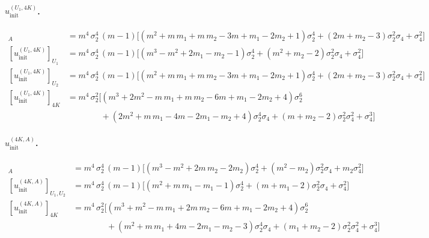 \documentclass[12pt,a4paper]{article}
\begin{document}
\paragraph{$u^{(U_{1}, 4K)}_{\mathrm{init}}$.}
\begin{align*}
[u^{(U_{1}, 4K)}_{\mathrm{init}}]_{A}
  &= m^{4}\,\sigma_{2}^{4}\,(m-1)\bigl[
       (m^{2} + m\,m_{1} + m\,m_{2} - 3m + m_{1} - 2m_{2} + 1)\sigma_{2}^{4}
       + (2m + m_{2} - 3)\sigma_{2}^{2}\sigma_{4} + \sigma_{4}^{2}\bigr]\\
[u^{(U_{1}, 4K)}_{\mathrm{init}}]_{U_{1}}
  &= m^{4}\,\sigma_{2}^{4}\,(m-1)\bigl[
       (m^{3} - m^{2} + 2m_{1} - m_{2} - 1)\sigma_{2}^{4}
       + (m^{2} + m_{2} - 2)\sigma_{2}^{2}\sigma_{4} + \sigma_{4}^{2}\bigr]\\
[u^{(U_{1}, 4K)}_{\mathrm{init}}]_{U_{2}}
  &= m^{4}\,\sigma_{2}^{4}\,(m-1)\bigl[
       (m^{2} + m\,m_{1} + m\,m_{2} - 3m + m_{1} - 2m_{2} + 1)\sigma_{2}^{4}
       + (2m + m_{2} - 3)\sigma_{2}^{2}\sigma_{4} + \sigma_{4}^{2}\bigr]\\
[u^{(U_{1}, 4K)}_{\mathrm{init}}]_{4K}
  &= m^{4}\,\sigma_{2}^{2}\bigl[
       (m^{3} + 2m^{2} - m\,m_{1} + m\,m_{2} - 6m + m_{1} - 2m_{2} + 4)\sigma_{2}^{6}\\
  &\hspace{4em}
       + (2m^{2} + m\,m_{1} - 4m - 2m_{1} - m_{2} + 4)\sigma_{2}^{4}\sigma_{4}
       + (m + m_{2} - 2)\sigma_{2}^{2}\sigma_{4}^{2} + \sigma_{4}^{3}\bigr]
\end{align*}

\paragraph{$u^{(4K, A)}_{\mathrm{init}}$.}
\begin{align*}
[u^{(4K, A)}_{\mathrm{init}}]_{A}
  &= m^{4}\,\sigma_{2}^{4}\,(m-1)\bigl[
       (m^{3} - m^{2} + 2m\,m_{2} - 2m_{2})\sigma_{2}^{4}
       + (m^{2} - m_{2})\sigma_{2}^{2}\sigma_{4} + m_{2}\sigma_{4}^{2}\bigr]\\
[u^{(4K, A)}_{\mathrm{init}}]_{U_{1}, U_{2}}
  &= m^{4}\,\sigma_{2}^{4}\,(m-1)\bigl[
       (m^{2} + m\,m_{1} - m_{1} - 1)\sigma_{2}^{4}
       + (m + m_{1} - 2)\sigma_{2}^{2}\sigma_{4} + \sigma_{4}^{2}\bigr]\\
[u^{(4K, A)}_{\mathrm{init}}]_{4K}
  &= m^{4}\,\sigma_{2}^{2}\bigl[
       (m^{3} + m^{2} - m\,m_{1} + 2m\,m_{2} - 6m + m_{1} - 2m_{2} + 4)\sigma_{2}^{6}\\
  &\hspace{4em}
       + (m^{2} + m\,m_{1} + 4m - 2m_{1} - m_{2} - 3)\sigma_{2}^{4}\sigma_{4}
       + (m_{1} + m_{2} - 2)\sigma_{2}^{2}\sigma_{4}^{2} + \sigma_{4}^{3}\bigr]
\end{align*}
\end{document}
